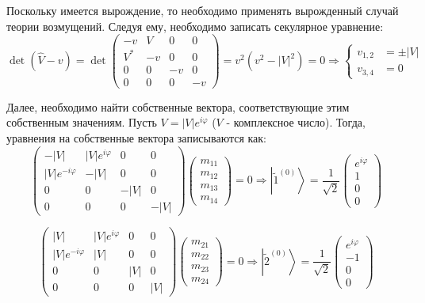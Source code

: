 \documentclass[a4paper,12pt]{article}
\begin{document}
\noindent
Поскольку имеется вырождение, то необходимо применять вырожденный
случай теории возмущений. Следуя ему, необходимо записать секулярное
уравнение:
\[
\det\left(\hat{V}-v\right)=\det\begin{pmatrix}-v & V & 0 & 0\\
V^{*} & -v & 0 & 0\\
0 & 0 & -v & 0\\
0 & 0 & 0 & -v
\end{pmatrix}
= v^{2}\left(v^{2}-\left|V\right|^{2}\right)=0\Rightarrow\begin{cases}
v_{1,2} & =\pm\left|V\right|\\
v_{3,4} & =0
\end{cases}
\]


\noindent
Далее, необходимо найти собственные вектора, соответствующие этим
собственным значениям. Пусть $V=\left|V\right|e^{i\varphi}$ ($V$
- комплексное число). Тогда, уравнения на собственные вектора записываются
как:
\[
\begin{pmatrix}-\left|V\right| & \left|V\right|e^{i\varphi} & 0 & 0\\
\left|V\right|e^{-i\varphi} & -\left|V\right| & 0 & 0\\
0 & 0 & -\left|V\right| & 0\\
0 & 0 & 0 & -\left|V\right|
\end{pmatrix}\begin{pmatrix}m_{11}\\
m_{12}\\
m_{13}\\
m_{14}
\end{pmatrix}=0
\Rightarrow\left|\widetilde{1}^{(0)}\right\rangle =\frac{1}{\sqrt{2}}\begin{pmatrix}e^{i\varphi}\\
1\\
0\\
0
\end{pmatrix}
\]


\[
\begin{pmatrix}\left|V\right| & \left|V\right|e^{i\varphi} & 0 & 0\\
\left|V\right|e^{-i\varphi} & \left|V\right| & 0 & 0\\
0 & 0 & \left|V\right| & 0\\
0 & 0 & 0 & \left|V\right|
\end{pmatrix}\begin{pmatrix}m_{21}\\
m_{22}\\
m_{23}\\
m_{24}
\end{pmatrix}=0
\Rightarrow\left|\widetilde{2}^{(0)}\right\rangle =\frac{1}{\sqrt{2}}\begin{pmatrix}e^{i\varphi}\\
-1\\
0\\
0
\end{pmatrix}
\]
\end{document}
